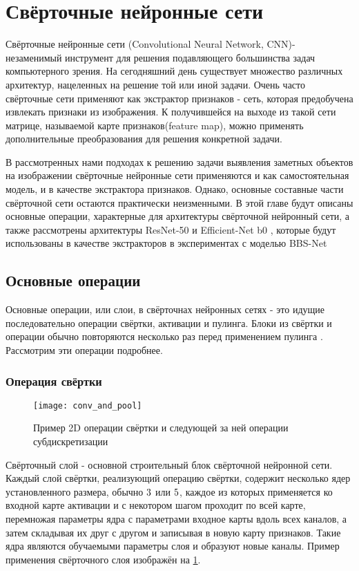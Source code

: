 \section{Свёрточные нейронные сети}


Свёрточные нейронные сети (Convolutional Neural Network, CNN)- незаменимый инструмент для решения подавляющего большинства задач компьютерного зрения. 
На сегодняшний день существует множество различных архитектур, нацеленных на решение той или иной задачи. 
Очень часто свёрточные сети применяют как экстрактор признаков - сеть, которая предобучена извлекать признаки из изображения. К получившейся 
на выходе из такой сети матрице, называемой карте признаков(feature map), можно применять дополнительные преобразования для решения конкретной задачи. 

В рассмотренных нами подходах к решению задачи выявления заметных объектов на изображении свёрточные нейронные сети 
применяются и как самостоятельная модель, и в качестве экстрактора признаков. Однако, основные составные части свёрточной сети 
остаются практически неизменными. В этой главе будут описаны основные операции, характерные для архитектуры свёрточной нейронный сети,
а также рассмотрены архитектуры ResNet-50\cite{ResNet} и Efficient-Net b0 \cite{Efficientnet}, которые будут использованы в качестве 
экстракторов в экспериментах с моделью BBS-Net \cite{BBS}


\subsection{Основные операции}
Основные операции, или слои, в свёрточнах нейронных сетях - это идущие последовательно операции свёртки, активации и пулинга. Блоки из свёртки и операции
обычно повторяются несколько раз перед применением пулинга \cite{ResNet}. Рассмотрим эти операции подробнее.

\subsubsection{Операция свёртки}

\begin{figure}[h]
    \centering
    \texttt{[image: conv\_and\_pool]}
    \caption{Пример 2D операции свёртки и следующей за ней операции субдискретизации}
    \label{fig:conv}
\end{figure}


Свёрточный слой - основной строительный блок свёрточной нейронной сети. Каждый слой свёртки, реализующий операцию свёртки,
содержит несколько ядер установленного размера, обычно $3 \time 3$ или $5 \time 5$, каждое из которых применяется ко входной карте 
активации и с некотором шагом проходит по всей карте, перемножая параметры ядра с параметрами входное карты вдоль всех каналов, 
а затем складывая их друг с другом и записывая в новую карту признаков. Такие ядра являются обучаемыми параметры слоя и образуют новые каналы.
Пример применения свёрточного слоя изображён на \ref{fig:conv}.


